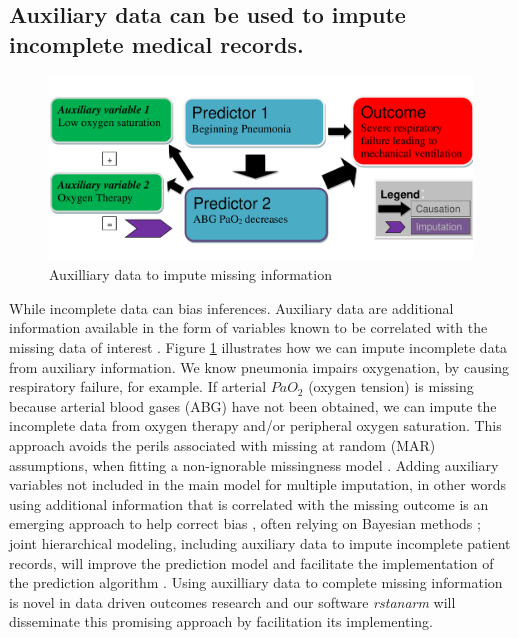 \documentclass[11pt,notitlepage]{article}
\begin{document}
\subsection*{Auxiliary data can be used to impute incomplete medical records.} 

\begin{figure} 
 \vspace{-10pt}
 \includegraphics[scale=0.4]{Figures/Bayesian_imputation.pdf}
    \vspace{-15pt}
  \caption{Auxilliary data to impute missing information}
   \vspace{-5pt}
   \label{fig:Imputation_fig}
\end{figure}

While incomplete data can bias inferences. Auxiliary data are additional information available in the form of variables known to be correlated with the missing data of interest \cite{Daniels24571539}. Figure \ref{fig:Imputation_fig} illustrates how we can impute incomplete data from auxiliary information. We know pneumonia impairs oxygenation, by causing respiratory failure, for example. If arterial $PaO_2$ (oxygen tension) is missing because arterial blood gases (ABG) have not been obtained, we can impute the incomplete data from oxygen therapy and/or peripheral oxygen saturation\cite{Hall_25389642}. This approach avoids the perils associated with missing at random (MAR) assumptions, when fitting a non-ignorable missingness model \cite{Wang_20029935}. Adding auxiliary variables not included in the main model for multiple imputation, in other words using additional information that is correlated with the missing outcome is an emerging approach to help correct bias \cite{Meng1994, Collins_11778676, Rubin1996}, often relying on Bayesian methods \cite{Daniels2008, Schafer1997}; joint hierarchical modeling, including auxiliary data to impute incomplete patient records, will improve the prediction model and facilitate the implementation of the prediction algorithm \cite{Hall_25389642}. Using auxilliary data to complete missing information is novel in data driven outcomes research and our software \textit{rstanarm} will disseminate this promising approach by facilitation its implementing. 
\end{document}
